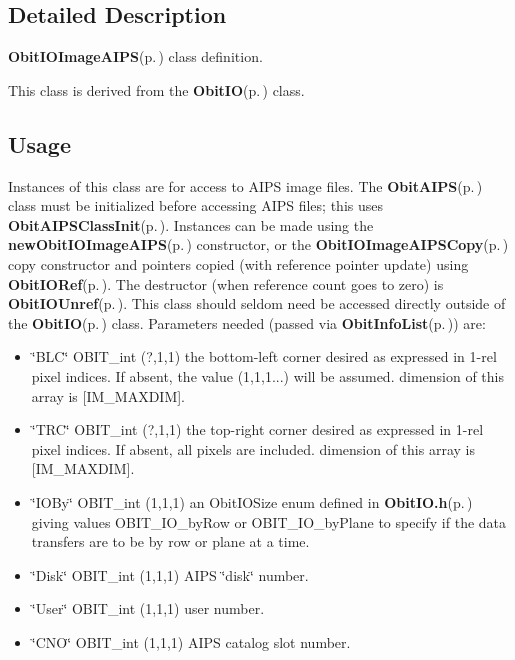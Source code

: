 \subsection{Detailed Description}
{\bf Obit\-IOImage\-AIPS}{\rm (p.\,\pageref{structObitIOImageAIPS})} class definition. 

This class is derived from the {\bf Obit\-IO}{\rm (p.\,\pageref{structObitIO})} class.\subsection{Usage}\label{ObitIOImageAIPS_8h_ObitIOImageAIPSUsage}
Instances of this class are for access to AIPS image files. The {\bf Obit\-AIPS}{\rm (p.\,\pageref{structObitAIPS})} class must be initialized before accessing AIPS files; this uses {\bf Obit\-AIPSClass\-Init}{\rm (p.\,\pageref{ObitAIPS_8c_a5})}. Instances can be made using the {\bf new\-Obit\-IOImage\-AIPS}{\rm (p.\,\pageref{ObitIOImageAIPS_8c_a6})} constructor, or the {\bf Obit\-IOImage\-AIPSCopy}{\rm (p.\,\pageref{ObitIOImageAIPS_8c_a11})} copy constructor and pointers copied (with reference pointer update) using {\bf Obit\-IORef}{\rm (p.\,\pageref{ObitIO_8h_a1})}. The destructor (when reference count goes to zero) is {\bf Obit\-IOUnref}{\rm (p.\,\pageref{ObitIO_8h_a0})}. This class should seldom need be accessed directly outside of the {\bf Obit\-IO}{\rm (p.\,\pageref{structObitIO})} class. Parameters needed (passed via {\bf Obit\-Info\-List}{\rm (p.\,\pageref{structObitInfoList})}) are: \begin{itemize}
\item \char`\"{}BLC\char`\"{} OBIT\_\-int (?,1,1) the bottom-left corner desired as expressed in 1-rel pixel indices. If absent, the value (1,1,1...) will be assumed. dimension of this array is [IM\_\-MAXDIM]. \item \char`\"{}TRC\char`\"{} OBIT\_\-int (?,1,1) the top-right corner desired as expressed in 1-rel pixel indices. If absent, all pixels are included. dimension of this array is [IM\_\-MAXDIM]. \item \char`\"{}IOBy\char`\"{} OBIT\_\-int (1,1,1) an Obit\-IOSize enum defined in {\bf Obit\-IO.h}{\rm (p.\,\pageref{ObitIO_8h})} giving values OBIT\_\-IO\_\-by\-Row or OBIT\_\-IO\_\-by\-Plane to specify if the data transfers are to be by row or plane at a time. \item \char`\"{}Disk\char`\"{} OBIT\_\-int (1,1,1) AIPS \char`\"{}disk\char`\"{} number. \item \char`\"{}User\char`\"{} OBIT\_\-int (1,1,1) user number. \item \char`\"{}CNO\char`\"{} OBIT\_\-int (1,1,1) AIPS catalog slot number.\end{itemize}


